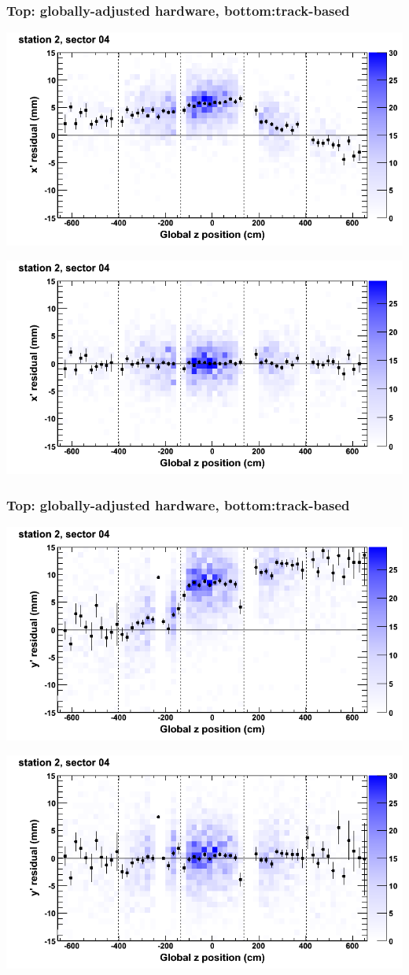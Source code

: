 \documentclass[compress]{beamer}
\begin{document}
\begin{frame}
\frametitle{Top: globally-adjusted hardware, bottom:track-based}
\includegraphics[width=0.7\linewidth]{NOV4_mapplots_HW/DTvsz_st2sec04_x.png}

\includegraphics[width=0.7\linewidth]{NOV4_mapplots/DTvsz_st2sec04_x.png}
\end{frame}

\begin{frame}
\frametitle{Top: globally-adjusted hardware, bottom:track-based}
\includegraphics[width=0.7\linewidth]{NOV4_mapplots_HW/DTvsz_st2sec04_y.png}

\includegraphics[width=0.7\linewidth]{NOV4_mapplots/DTvsz_st2sec04_y.png}
\end{frame}
\end{document}
